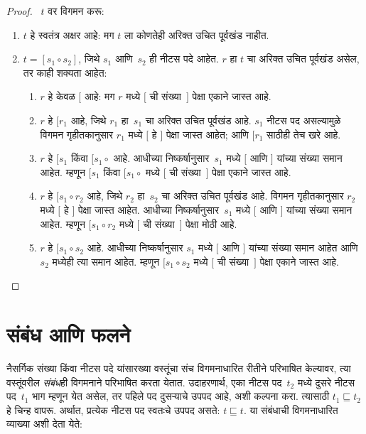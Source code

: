 \begin{proof}
~$t$ वर विगमन करू:
\begin{enumerate}
\item $t$ हे स्वतंत्र अक्षर आहे: मग $t$ ला कोणतेही अरिक्त उचित पूर्वखंड नाहीत.
\item $t = [s_1 \circ s_2]$, जिथे $s_1$ आणि~$s_2$ ही नीटस पदे आहेत. $r$ हा $t$ चा अरिक्त उचित पूर्वखंड असेल, तर काही शक्यता आहेत:
\begin{enumerate}
\item $r$ हे केवळ $[$ आहे: मग $r$ मध्ये $[$ ची संख्या~$]$ पेक्षा एकाने जास्त आहे.
\item $r$ हे $[r_1$ आहे, जिथे $r_1$ हा~$s_1$ चा अरिक्त उचित पूर्वखंड आहे. $s_1$ नीटस पद असल्यामुळे विगमन गृहीतकानुसार $r_1$ मध्ये $[$ हे $]$ पेक्षा जास्त आहेत; आणि $[r_1$ साठीही तेच खरे आहे.
\item $r$ हे $[s_1$ किंवा $[s_1 \circ {}$ आहे. आधीच्या निष्कर्षानुसार~$s_1$ मध्ये $[$ आणि $]$ यांच्या संख्या समान आहेत. म्हणून $[s_1$ किंवा $[s_1 \circ {}$ मध्ये $[$ ची संख्या~$]$ पेक्षा एकाने जास्त आहे.
\item $r$ हे $[s_1 \circ r_2$ आहे, जिथे $r_2$ हा~$s_2$ चा अरिक्त उचित पूर्वखंड आहे. विगमन गृहीतकानुसार $r_2$ मध्ये $[$ हे $]$ पेक्षा जास्त आहेत. आधीच्या निष्कर्षानुसार~$s_1$ मध्ये $[$ आणि $]$ यांच्या संख्या समान आहेत. म्हणून $[s_1 \circ r_2$ मध्ये $[$ ची संख्या~$]$ पेक्षा मोठी आहे.
\item $r$ हे $[s_1 \circ s_2$ आहे. आधीच्या निष्कर्षानुसार $s_1$ मध्ये $[$ आणि $]$ यांच्या संख्या समान आहेत आणि~$s_2$ मध्येही त्या समान आहेत. म्हणून $[s_1 \circ s_2$ मध्ये $[$ ची संख्या~$]$ पेक्षा एकाने जास्त आहे.
\end{enumerate}
\end{enumerate}
\end{proof}












\section{संबंध आणि फलने}\label{mth:ind:rel:sec}

नैसर्गिक संख्या किंवा नीटस पदे यांसारख्या वस्तूंचा संच विगमनाधारित रीतीने परिभाषित केल्यावर, त्या वस्तूंवरील \emph{संबंध}ही विगमनाने परिभाषित करता येतात. उदाहरणार्थ, एका नीटस पद~$t_2$ मध्ये दुसरे नीटस पद~$t_1$ भाग म्हणून येत असेल, तर पहिले पद दुसऱ्याचे उपपद आहे, अशी कल्पना करा. त्यासाठी $t_1 \sqsubseteq t_2$ हे चिन्ह वापरू. अर्थात, प्रत्येक नीटस पद स्वतःचे उपपद असते: $t \sqsubseteq t$. या संबंधाची विगमनाधारित व्याख्या अशी देता येते:

